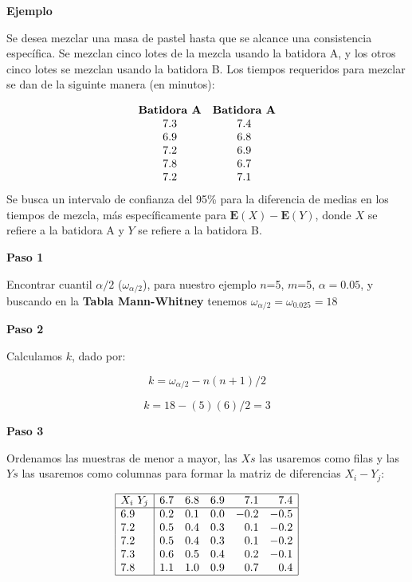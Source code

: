 \documentclass[a4paper,oneside,openany]{book}
\begin{document}
\textbf{Ejemplo}

Se desea mezclar una masa de pastel hasta que se alcance una
consistencia específica. Se mezclan cinco lotes de la mezcla usando la
batidora A, y los otros cinco lotes se mezclan usando la batidora B. Los
tiempos requeridos para mezclar se dan de la siguinte manera (en
minutos):

\[
\begin{equation*}
\begin{array}{c c}
\textbf{Batidora A} & \textbf{Batidora A} \\
7.3 & 7.4 \\
6.9 & 6.8  \\
7.2 & 6.9 \\
7.8 & 6.7 \\
7.2 & 7.1 \\
\end{array}
\end{equation*}
\] Se busca un intervalo de confianza del 95\% para la diferencia de
medias en los tiempos de mezcla, más específicamente para
\(\mathbf{E}(X)-\mathbf{E}(Y)\), donde \(X\) se refiere a la batidora A
y \(Y\) se refiere a la batidora B.

\textbf{Paso 1}

Encontrar cuantil \(\alpha/2\) (\(\omega_{\alpha/2}\)), para nuestro
ejemplo \(n\)=5, \(m\)=5, \(\alpha=0.05\), y buscando en la
\textbf{Tabla Mann-Whitney} tenemos
\(\omega_{\alpha/2}=\omega_{0.025}=18\)

\textbf{Paso 2}

Calculamos \(k\), dado por:

\[k= \omega_{\alpha/2}-n(n+1)/2\]

\[k=18-(5)(6)/2=3\]

\textbf{Paso 3}

Ordenamos las muestras de menor a mayor, las \(Xs\) las usaremos como
filas y las \(Ys\) las usaremos como columnas para formar la matriz de
diferencias \(X_{i}-Y_{j}\):

\[
\begin{equation*}
\begin{array}{|l| r r r r r|}
\hline
X_{i} \ Y_{j} & 6.7 & 6.8 & 6.9 & 7.1 & 7.4 \\
\hline
6.9 & 0.2 & 0.1 & 0.0 & -0.2 & -0.5 \\
7.2 & 0.5 & 0.4 & 0.3 &  0.1 & -0.2 \\
7.2 & 0.5 & 0.4 & 0.3 &  0.1 & -0.2 \\
7.3 & 0.6 & 0.5 & 0.4 &  0.2 & -0.1 \\
7.8 & 1.1 & 1.0 & 0.9 &  0.7 &  0.4 \\
\hline
\end{array}
\end{equation*}
\]
\end{document}
